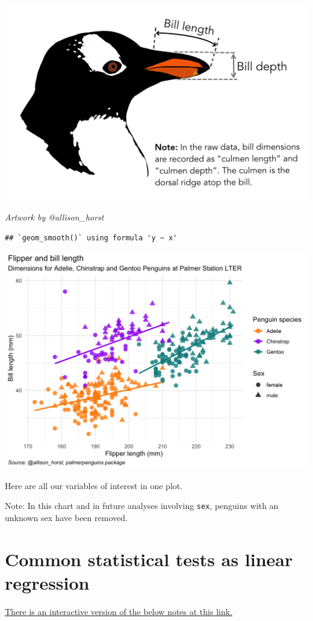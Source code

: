 \documentclass[
  openany]{book}
\begin{document}
\begin{center}\includegraphics[width=0.4\linewidth]{images/m1/culmen_depth} \end{center}

\emph{Artwork by @allison\_horst}

\begin{verbatim}
## `geom_smooth()` using formula 'y ~ x'
\end{verbatim}

\begin{center}\includegraphics[width=0.9\linewidth]{images/m1/ah_plot} \end{center}

Here are all our variables of interest in one plot.

Note: In this chart and in future analyses involving \texttt{sex}, penguins with an unknown sex have been removed.

\hypertarget{common-statistical-tests-as-linear-regression}{%
\section{Common statistical tests as linear regression}\label{common-statistical-tests-as-linear-regression}}

\href{https://jupyter.utoronto.ca/hub/user-redirect/git-pull?repo=https\%3A\%2F\%2Fgithub.com\%2Fsta303-bolton\%2Fsta303-w22-activities\&urlpath=shiny\%2Fsta303-w22-activities\%2Finst\%2Ftutorials\%2Fsta303_m1_tests\%2F\&branch=master}{There is an interactive version of the below notes at this link.}
\end{document}
